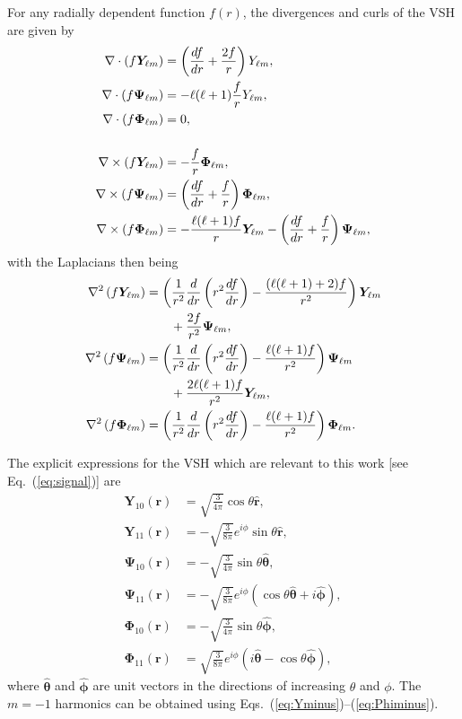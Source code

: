 \documentclass[amsmath,amssymb,aps,10pt,prd,letterpaper,nofootinbib,balancelastpage,notitlepage,superscriptaddress,twocolumn,floatfix]{revtex4-2}
\renewcommand{\eqref}[2][]{Eq{#1}.~(\ref{eq:#2})}	%
\newcommand{\eqrefRange}[2]{Eqs.~(\ref{eq:#1})--(\ref{eq:#2})}
\newcommand{\lb}{\ensuremath{\left}}					%
\newcommand{\rb}{\ensuremath{\right}}					%
\newcommand{\nl}{\nonumber \\ & \quad }					%
\newcommand{\phihat}{\bm{\hat{\phi}}}
\newcommand{\thetahat}{\bm{\hat{\theta}}}
\newcommand{\rhat}{\bm{\hat{r}}}
\begin{document}
For any radially dependent function $f(r)$, the divergences and curls of the VSH are given by
\begin{align}
    \nabla \cdot \lb(f\bm{Y}_{\ell m}\rb)&=\lb( \frac{df}{dr} + \frac{2f}{r} \rb) Y_{\ell m},\label{eq:Ydiv}\\
    \nabla \cdot \lb(f\bm{\Psi}_{\ell m}\rb)&= -\ell(\ell+1) \frac{f}{r} Y_{\ell m},\label{eq:Psidiv}\\
    \nabla \cdot \lb(f\bm{\Phi}_{\ell m}\rb)&=0,\label{eq:Phildiv}\\[3ex]
    \nabla\times\lb(f\bm{Y}_{\ell m}\rb)&=-\frac fr\bm{\Phi}_{\ell m},\label{eq:Ycurl}\\
    \nabla\times\lb(f\bm{\Psi}_{\ell m}\rb)&=\lb(\frac{df}{dr}+\frac fr\rb)\bm{\Phi}_{\ell m},\label{eq:Psicurl}\\
    \nabla\times\lb(f\bm{\Phi}_{\ell m}\rb)&=-\frac{\ell(\ell+1)f}r\bm{Y}_{\ell m}-\lb(\frac{df}{dr}+\frac fr\rb)\bm{\Psi}_{\ell m},\label{eq:Phicurl}
\end{align}
with the Laplacians then being
\begin{align}
    \nabla^2\lb(f\bm{Y}_{\ell m}\rb)
        &=\lb(\frac1{r^2}\frac d{dr}\lb(r^2\frac{df}{dr}\rb)-\frac{(\ell(\ell+1)+2)f}{r^2}\rb)\bm{Y}_{\ell m}
        \nl\quad +\frac{2f}{r^2}\bm{\Psi}_{\ell m},\label{eq:Ylaplace}\\
    \nabla^2\lb(f\bm{\Psi}_{\ell m}\rb)
        &=\lb(\frac1{r^2}\frac d{dr}\lb(r^2\frac{df}{dr}\rb)-\frac{\ell(\ell+1)f}{r^2}\rb)\bm{\Psi}_{\ell m}
        \nl\quad +\frac{2\ell(\ell+1)f}{r^2}\bm{Y}_{\ell m},\label{eq:Psilaplace}\\
    \nabla^2\lb(f\bm{\Phi}_{\ell m}\rb)
        &=\lb(\frac1{r^2}\frac d{dr}\lb(r^2\frac{df}{dr}\rb)-\frac{\ell(\ell+1)f}{r^2}\rb)\bm{\Phi}_{\ell m}.\label{eq:Philaplace}
\end{align}

The explicit expressions for the VSH which are relevant to this work [see \eqref{signal}] are
\begin{align}
    \bm{Y}_{10}(\bm{r})&=\sqrt{\frac3{4\pi}}\cos\theta \rhat\label{eq:Y10},\\
    \bm{Y}_{11}(\bm{r})&=-\sqrt{\frac3{8\pi}}e^{i\phi}\sin\theta\rhat\label{eq:Y11},\\
    \bm{\Psi}_{10}(\bm{r})&=-\sqrt{\frac3{4\pi}}\sin\theta\thetahat\label{eq:Psi10},\\ 
    \bm{\Psi}_{11}(\bm{r})&=-\sqrt{\frac3{8\pi}}e^{i\phi}(\cos\theta\thetahat+i\phihat)\label{eq:Psi11},\\
    \bm{\Phi}_{10}(\bm{r})&=-\sqrt{\frac3{4\pi}}\sin\theta\phihat\label{eq:Phi10},\\
    \bm{\Phi}_{11}(\bm{r})&=\sqrt{\frac3{8\pi}}e^{i\phi}(i\thetahat-\cos\theta\phihat)\label{eq:Phi11},
\end{align}
where $\thetahat$ and $\phihat$ are unit vectors in the directions of increasing $\theta$ and $\phi$. 
The $m=-1$ harmonics can be obtained using \eqrefRange{Yminus}{Phiminus}.
\end{document}
